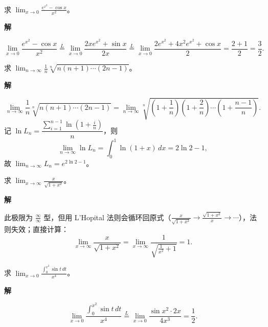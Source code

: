 \documentclass[lang=cn,chinesefont=founder,10pt]{elegantbook}
\renewenvironment{proof}[1][\proofname]{
  \par\noindent\textbf{\color{second}#1\;}\par\noindent
  \color{black!90}\cfs}{
  \par}
\begin{document}
\begin{example}
    求 $\displaystyle\lim_{x \to 0} \frac{e^{x^2} - \cos x}{x^2}$。
\end{example}

\begin{proof}[解]
    \[
        \lim_{x \to 0} \frac{e^{x^2} - \cos x}{x^2}
        \stackrel{L}{=} \lim_{x \to 0} \frac{2xe^{x^2} + \sin x}{2x}
        \stackrel{L}{=} \lim_{x \to 0} \frac{2e^{x^2} + 4x^2e^{x^2} + \cos x}{2}
        = \frac{2+1}{2}
        = \frac{3}{2}.
    \]
\end{proof}

\begin{example}
    求 $\displaystyle\lim_{n \to \infty} \frac{1}{n}\sqrt[n]{n(n+1)\cdots(2n-1)}$。
\end{example}

\begin{proof}[解]
    \[
        \lim_{n \to \infty} \frac{1}{n}\sqrt[n]{n(n+1)\cdots(2n-1)}
        = \lim_{n \to \infty} \sqrt[n]{\left(1+\frac{1}{n}\right)\left(1+\frac{2}{n}\right)\cdots\left(1+\frac{n-1}{n}\right)}.
    \]
    记 $\ln L_n = \dfrac{\sum_{i=1}^{n-1}\ln\left(1+\frac{i}{n}\right)}{n}$，则
    \[
        \lim_{n \to \infty} \ln L_n = \int_0^1 \ln(1+x)\,dx = 2\ln 2 - 1,
    \]
    故 $\lim_{n \to \infty} L_n = e^{2\ln 2 - 1}$。
\end{proof}

\begin{example}
    求 $\displaystyle\lim_{x \to \infty} \frac{x}{\sqrt{1+x^2}}$。
\end{example}

\begin{proof}[解]
    此极限为 $\frac{\infty}{\infty}$ 型，但用 L'Hopital 法则会循环回原式（$\frac{x}{\sqrt{1+x^2}} \to \frac{\sqrt{1+x^2}}{x} \to \cdots$），法则失效；直接计算：
    \[
        \lim_{x \to \infty} \frac{x}{\sqrt{1+x^2}}
        = \lim_{x \to \infty} \frac{1}{\sqrt{\frac{1}{x^2}+1}}
        = 1.
    \]
\end{proof}

\begin{example}
    求 $\displaystyle\lim_{x \to 0} \frac{\int_0^{x^2}\sin t\,dt}{x^4}$。
\end{example}

\begin{proof}[解]
    \[
        \lim_{x \to 0} \frac{\int_0^{x^2}\sin t\,dt}{x^4}
        \stackrel{L}{=} \lim_{x \to 0} \frac{\sin x^2\cdot 2x}{4x^3}
        = \frac{1}{2}.
    \]
\end{proof}
\end{document}
